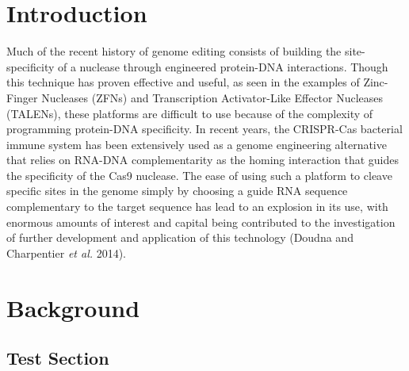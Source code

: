 \documentclass{Dissertate}
\begin{document}

\maketitle

\nocite{*}

\abstractpage
\tableofcontents
\dedicationpage
\acknowledgments

\doublespacing

\setcounter{chapter}{-1}  %

\chapter{Introduction}
\label{introduction}

Much of the recent history of genome editing consists of building the site-specificity of a nuclease through engineered protein-DNA interactions. Though this technique has proven effective and useful, as seen in the examples of Zinc-Finger Nucleases (ZFNs) and Transcription Activator-Like Effector Nucleases (TALENs), these platforms are difficult to use because of the complexity of programming protein-DNA specificity.
In recent years, the CRISPR-Cas bacterial immune system has been extensively used as a genome engineering alternative that relies on RNA-DNA complementarity as the homing interaction that guides the specificity of the Cas9 nuclease. The ease of using such a platform to cleave specific sites in the genome simply by choosing a guide RNA sequence complementary to the target sequence has lead to an explosion in its use, with enormous amounts of interest and capital being contributed to the investigation of further development and application of this technology (Doudna and Charpentier \textit{et al.} 2014).

\chapter{Background}
\label{Background}

\section{Test Section}
\end{document}
